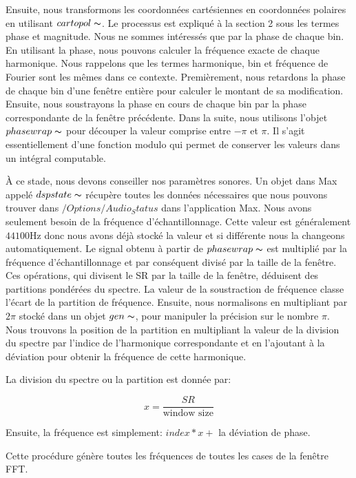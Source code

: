 Ensuite, nous transformons les coordonnées cartésiennes en coordonnées polaires en utilisant $ cartopol \thicksim $. Le processus est expliqué à la section 2 sous les termes phase et magnitude. Nous ne sommes intéressés que par la phase de chaque bin. En utilisant la phase, nous pouvons calculer la fréquence exacte de chaque harmonique. Nous rappelons que les termes harmonique, bin et fréquence de Fourier sont les mêmes dans ce contexte.
Premièrement, nous retardons la phase de chaque bin d'une fenêtre entière pour calculer le montant de sa modification. Ensuite, nous soustrayons la phase en cours de chaque bin par la phase correspondante de la fenêtre précédente. Dans la suite, nous utilisons l’objet $ phasewrap \thicksim $ pour découper la valeur comprise entre $ - \pi $ et $ \pi $. Il s'agit essentiellement d'une fonction modulo qui permet de conserver les valeurs dans un intégral computable.

À ce stade, nous devons conseiller nos paramètres sonores. Un objet dans Max appelé $ dspstate \thicksim $ récupère toutes les données nécessaires que nous pouvons trouver dans $ / Options / Audio_Status $ dans l'application Max. Nous avons seulement besoin de la fréquence d'échantillonnage. Cette valeur est généralement $ 44100 $Hz donc nous avons déjà stocké la valeur et si différente nous la changeons automatiquement. Le signal obtenu à partir de $ phasewrap \thicksim $ est multiplié par la fréquence d'échantillonnage et par conséquent divisé par la taille de la fenêtre. Ces opérations, qui divisent le SR par la taille de la fenêtre, déduisent des partitions pondérées du spectre. La valeur de la soustraction de fréquence classe l’écart de la partition de fréquence. Ensuite, nous normalisons en multipliant par $ 2 \pi $ stocké dans un objet $ gen \thicksim $, pour manipuler la précision sur le nombre $\pi$. Nous trouvons la position de la partition en multipliant la valeur de la division du spectre par l'indice de l’harmonique correspondante et en l'ajoutant à la déviation pour obtenir la fréquence de cette harmonique.

La division du spectre ou la partition est donnée par:

    \begin{equation*}
        x = \frac{SR}{\text{window size}}
    \end{equation*}

Ensuite, la fréquence est simplement: $ index * x + $ la déviation de phase.

Cette procédure génère toutes les fréquences de toutes les cases de la fenêtre FFT.

